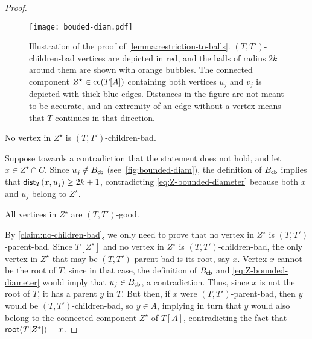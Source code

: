 \documentclass[a4paper,UKenglish,cleveref, autoref, thm-restate]{lipics-v2021}
\newenvironment{cproof}{\proof[Proof of claim]\renewcommand\qedsymbol{$\diamond$}}{\endproof}
\renewcommand{\root}{{\sf root}\xspace}
\newcommand{\dist}{{\sf dist}\xspace}
\newcommand{\Bcb}{B_{\sf cb}\xspace}
\begin{document}
\begin{proof}
\begin{figure}[h!tb]
    \centering
    \vspace{-.35cm}
    \texttt{[image: bouded-diam.pdf]}
    \caption{Illustration of the proof of  \autoref{lemma:restriction-to-balls}. $(T,T')$-children-bad vertices are depicted in red, and the balls of radius $2k$ around them are shown with orange bubbles. The connected component $Z^{\star} \in {\sf cc}(T[A])$ containing both vertices $u_j$ and $v_j$  is depicted with thick blue edges. Distances in the figure are not meant to be accurate, and an extremity of an edge without a vertex means that $T$ continues in that direction.\label{fig:bounded-diam}}
\end{figure}

\begin{claim}\label{claim:no-children-bad}
    No vertex in $Z^{\star}$ is $(T,T')$-children-bad.
\end{claim}
\begin{cproof}
Suppose towards a contradiction that the statement does not hold, and let $x \in Z^{\star} \cap C$. Since $u_j  \notin \Bcb$ (see~\autoref{fig:bounded-diam}), the definition of $\Bcb$ implies that $\dist_T(x,u_j) \geq 2k+1$, contradicting \autoref{eq:Z-bounded-diameter} because both $x$ and $u_j$ belong to $Z^{\star}$.
\end{cproof}

\begin{claim}\label{claim:no-bad}
    All vertices in  $Z^{\star}$ are $(T,T')$-good.
\end{claim}
\begin{cproof}
    By \autoref{claim:no-children-bad}, we only need to prove that
    no vertex in $Z^{\star}$ is $(T,T')$-parent-bad. Since $T[Z^{\star}]$ and no vertex in $Z^{\star}$ is $(T,T')$-children-bad, the only vertex in $Z^{\star}$ that may be $(T,T')$-parent-bad is its root, say $x$. Vertex $x$ cannot be the root of $T$, since in that case, the definition of $\Bcb$ and \autoref{eq:Z-bounded-diameter} would imply that $u_j \in \Bcb$, a contradiction. Thus, since $x$ is not the root of $T$, it has a parent $y$ in $T$. But then, if $x$ were $(T,T')$-parent-bad, then $y$ would be $(T,T')$-children-bad, so $y \in A$, implying in turn that $y$ would also belong to the connected component $Z^{\star}$ of $T[A]$, contradicting the fact that $\root(T[Z^{\star}])=x$.
\end{cproof}


\end{proof}
\end{document}
